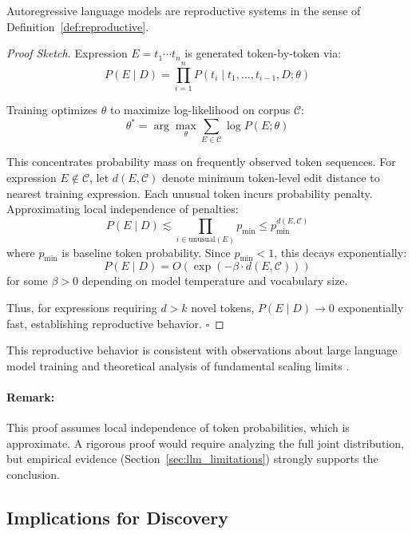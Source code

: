 \documentclass[twoside,11pt]{article}
\newcommand{\qed}{\hfill$\square$}
\begin{document}
\begin{theorem}
\label{thm:llm_reproductive}
Autoregressive language models are reproductive systems in the sense of Definition~\ref{def:reproductive}.
\end{theorem}

\begin{proof}[Proof Sketch]
Expression $E = t_1 \cdots t_n$ is generated token-by-token via:
\[
P(E \mid D) = \prod_{i=1}^n P(t_i \mid t_1, \ldots, t_{i-1}, D; \theta)
\]

Training optimizes $\theta$ to maximize log-likelihood on corpus $\mathcal{C}$:
\[
\theta^* = \arg\max_\theta \sum_{E \in \mathcal{C}} \log P(E; \theta)
\]

This concentrates probability mass on frequently observed token sequences. For expression $E \notin \mathcal{C}$, let $d(E, \mathcal{C})$ denote minimum token-level edit distance to nearest training expression. Each unusual token incurs probability penalty. Approximating local independence of penalties:
\[
P(E \mid D) \lesssim \prod_{i \in \text{unusual}(E)} p_{\min} \leq p_{\min}^{d(E, \mathcal{C})}
\]
where $p_{\min}$ is baseline token probability. Since $p_{\min} < 1$, this decays exponentially:
\[
P(E \mid D) = O(\exp(-\beta \cdot d(E, \mathcal{C})))
\]
for some $\beta > 0$ depending on model temperature and vocabulary size.

Thus, for expressions requiring $d > k$ novel tokens, $P(E \mid D) \to 0$ exponentially fast, establishing reproductive behavior. \qed
\end{proof}

This reproductive behavior is consistent with observations about large language model training \citep{hoffmann2022training} and theoretical analysis of fundamental scaling limits \citep{xu2025fundamental}.

\paragraph{Remark:} This proof assumes local independence of token probabilities, which is approximate. A rigorous proof would require analyzing the full joint distribution, but empirical evidence (Section~\ref{sec:llm_limitations}) strongly supports the conclusion.

\subsection{Implications for Discovery}
\end{document}
